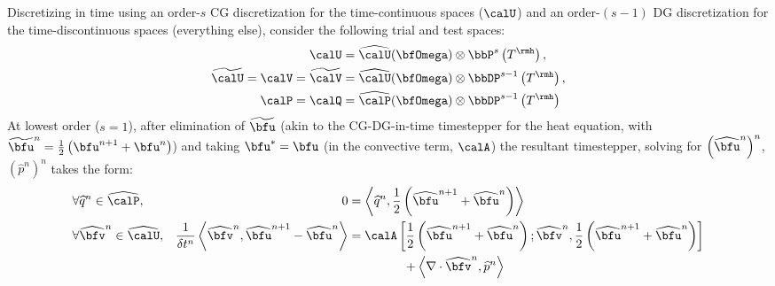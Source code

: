 
    \line

    \begin{example}
        Discretizing in time using an order-$s$ CG discretization for the time-continuous spaces ($\calU$) and an order-$(s - 1)$ DG discretization for the time-discontinuous spaces (everything else), consider the following trial and test spaces:
        \begin{align}
            \calU  &=  \widehat{\calU}(\bfOmega)\otimes\bbP^{s}\left(T^{\rmh}\right),  \\
            \widetilde{\calU}  =  \calV  =  \widetilde{\calV}  &=  \widehat{\calU}(\bfOmega)\otimes\bbDP^{s - 1}\left(T^{\rmh}\right),  \\
            \calP  =  \calQ  &=  \widehat{\calP}(\bfOmega)\otimes\bbDP^{s - 1}\left(T^{\rmh}\right)
        \end{align}
        At lowest order ($s = 1$), after elimination of $\widetilde{\bfu}$ (akin to the CG-DG-in-time timestepper for the heat equation, with $\widetilde{\bfu}^{n}  =  \frac{1}{2}\left(\bfu^{n + 1} + \bfu^{n}\right)$) and taking $\bfu^{*} = \bfu$ (in the convective term, $\calA$) the resultant timestepper, solving for $\left(\widehat{\bfu}^{n}\right)^{n}$, $\left(\widehat{p}^{n}\right)^{n}$ takes the form:
        \begin{align*}
            &\forall  \widehat{q}^{n}     \in  \widehat{\calP},  &                                                                                                               0  &=  \left\langle \widehat{q}^{n}, \frac{1}{2}\left(\widehat{\bfu}^{n + 1} + \widehat{\bfu}^{n}\right)\right\rangle  \\
            &\forall  \widehat{\bfv}^{n}  \in  \widehat{\calU},  &  \frac{1}{\delta t^{n}}\left\langle\widehat{\bfv}^{n}, \widehat{\bfu}^{n + 1} - \widehat{\bfu}^{n}\right\rangle  &=  \calA\left[\frac{1}{2}\left(\widehat{\bfu}^{n + 1} + \widehat{\bfu}^{n}\right); \widehat{\bfv}^{n}, \frac{1}{2}\left(\widehat{\bfu}^{n + 1} + \widehat{\bfu}^{n}\right)\right]  \\
            &                                                    &                                                                                                                  &\;\;\;\;\;\;\;\;\;\;\;\;\;\;\;\;  + \left\langle\nabla\cdot\widehat{\bfv}^{n}, \widehat{p}^{n}\right\rangle  \\

\end{align*}
\end{example}
